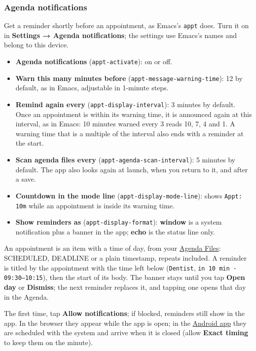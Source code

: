 \documentclass[11pt]{article}
\begin{document}
\subsubsection{Agenda notifications}
\label{sec:org4c355fc}
Get a reminder shortly before an appointment, as Emacs's \texttt{appt} does. Turn it on in \textbf{Settings → Agenda notifications}; the settings use Emacs's names and belong to this device.

\begin{itemize}
\item \textbf{Agenda notifications} (\texttt{appt-activate}): on or off.
\item \textbf{Warn this many minutes before} (\texttt{appt-message-warning-time}): 12 by default, as in Emacs, adjustable in 1-minute steps.
\item \textbf{Remind again every} (\texttt{appt-display-interval}): 3 minutes by default. Once an appointment is within its warning time, it is announced again at this interval, as in Emacs: 10 minutes warned every 3 reads 10, 7, 4 and 1. A warning time that is a multiple of the interval also ends with a reminder at the start.
\item \textbf{Scan agenda files every} (\texttt{appt-agenda-scan-interval}): 5 minutes by default. The app also looks again at launch, when you return to it, and after a save.
\item \textbf{Countdown in the mode line} (\texttt{appt-display-mode-line}): shows \texttt{Appt: 10m} while an appointment is inside its warning time.
\item \textbf{Show reminders as} (\texttt{appt-display-format}): \textbf{window} is a system notification plus a banner in the app; \textbf{echo} is the status line only.
\end{itemize}

An appointment is an item with a time of day, from your \hyperref[sec:org4d24003]{Agenda Files}: SCHEDULED, DEADLINE or a plain timestamp, repeats included. A reminder is titled by the appointment with the time left below (\texttt{Dentist}, \texttt{in 10 min · 09:30–10:15}), then the start of its body. The banner stays until you tap \textbf{Open day} or \textbf{Dismiss}; the next reminder replaces it, and tapping one opens that day in the Agenda.

The first time, tap \textbf{Allow notifications}; if blocked, reminders still show in the app. In the browser they appear while the app is open; in the \hyperref[sec:org5b8e0d4]{Android app} they are scheduled with the system and arrive when it is closed (allow \textbf{Exact timing} to keep them on the minute).
\end{document}
